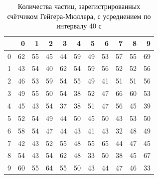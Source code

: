 \documentclass[12pt]{article}
\begin{document}
\begin{table}[H]
    \begin{center}
        \begin{tabular}{|l|r|r|r|r|r|r|r|r|r|r|}
            \hline
              & 0  & 1  & 2  & 3  & 4  & 5  & 6  & 7  & 8  & 9  \\
            \hline
            0 & 62 & 55 & 45 & 44 & 59 & 49 & 53 & 57 & 55 & 69 \\
            1 & 43 & 54 & 40 & 62 & 54 & 59 & 56 & 52 & 52 & 56 \\
            2 & 46 & 53 & 59 & 54 & 55 & 49 & 41 & 51 & 51 & 56 \\
            3 & 49 & 55 & 50 & 54 & 38 & 52 & 47 & 66 & 60 & 53 \\
            4 & 45 & 43 & 54 & 37 & 38 & 51 & 47 & 56 & 45 & 39 \\
            5 & 52 & 54 & 49 & 44 & 50 & 45 & 50 & 43 & 53 & 50 \\
            6 & 58 & 54 & 47 & 44 & 43 & 41 & 43 & 32 & 48 & 49 \\
            7 & 42 & 43 & 52 & 55 & 48 & 55 & 65 & 44 & 47 & 45 \\
            8 & 54 & 43 & 54 & 62 & 48 & 33 & 50 & 38 & 45 & 67 \\
            9 & 60 & 55 & 64 & 55 & 50 & 43 & 44 & 47 & 46 & 33 \\
            \hline
        \end{tabular}
    \end{center}
    \caption{Количества частиц, зарегистрированных счётчиком Гейгера-Мюллера, с усреднением по интервалу 40 с}
    \label{tab:3}
\end{table}
\end{document}
